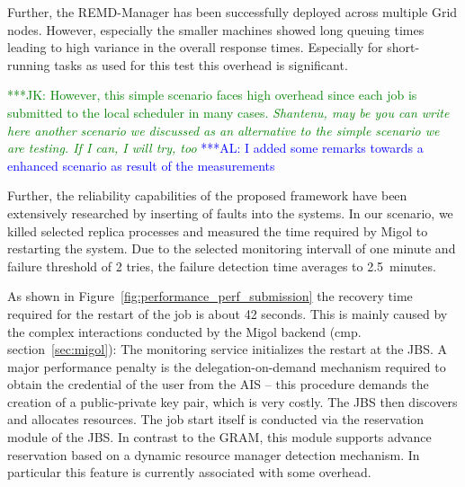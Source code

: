 \documentclass[times, 10pt, twocolumn]{article}
\newcommand{\kimnote}[1]{ {\textcolor{green} { ***JK: #1 }}}
\newcommand{\alnote}[1]{ {\textcolor{blue} { ***AL: #1 }}}
\newcommand{\kimnote}[1]{}
\newcommand{\alnote}[1]{}
\begin{document}
Further, the REMD-Manager has been successfully deployed across
multiple Grid nodes.  
However, especially the smaller machines showed
long queuing times leading to high variance in the overall response
times. Especially for short-running tasks as used for this test this 
overhead is significant. 

\kimnote{However, this simple scenario faces high overhead since each
  job is submitted to the local scheduler in many cases. \it
  Shantenu, may be you can write here another scenario we discussed
  as an alternative to the simple scenario we are testing.  If I can,
  I will try, too }            
\alnote{I added some remarks towards a enhanced scenario as result of the measurements}  

Further, the reliability capabilities of the proposed framework have
been extensively researched by inserting of faults into the
systems. In our scenario, we killed selected replica processes and
measured the time required by Migol to restarting the system.  Due to
the selected monitoring intervall of one minute and failure threshold
of 2 tries, the failure detection time averages to 2.5\, minutes.

As shown in Figure~\ref{fig:performance_perf_submission} the recovery
time required for the restart of the job is about 42 seconds. This is
mainly caused by the complex interactions conducted by the Migol
backend (cmp. section~\ref{sec:migol}): The monitoring service
initializes the restart at the JBS.  A major performance penalty is
the delegation-on-demand mechanism required to obtain the credential
of the user from the AIS -- this procedure demands the creation of a
public-private key pair, which is very costly. The JBS then discovers
and allocates resources.  The job start itself is conducted via the
reservation module of the JBS. In contrast to the GRAM, this module
supports advance reservation based on a dynamic resource manager detection
mechanism. In particular this feature is currently associated with 
some overhead.

\end{document}
